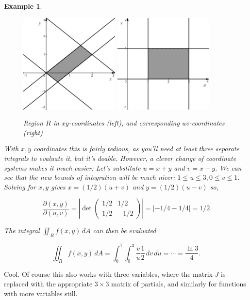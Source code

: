 \documentclass[12pt]{article}
\numberwithin{equation}{subsection}
\numberwithin{figure}{subsection}
\theoremstyle{note}
\newtheorem{example}[subsection]{Example}
\begin{document}
{\begin{example}
\begin{figure}[h!]
\centering 
\includegraphics[height=50mm]{Images/ws65-xy} \hspace{30mm} \includegraphics[height=50mm]{Images/ws65-uv}
\caption{Region $R$ in $xy$-coordinates (left), and corresponding $uv$-coordinates (right)}
\label{fig-change-of-var}
\end{figure}


With $x,y$ coordinates this is fairly tedious, as you'll need at least three separate integrals to evaluate it, but it's doable. However, a clever change of coordinate systems makes it much easier: Let's substitute $u=x+y$ and $v=x-y$. We can see that the new bounds of integration will be much nicer: $1\leq u\leq 3, 0\leq v \leq 1$. Solving for $x,y$ gives $x=(1/2)(u+v)$ and $y=(1/2)(u-v)$ so, 

\[ \dfrac{\partial(x,y)}{\partial(u,v)} = \left| \det \begin{pmatrix} 1/2 & 1/2 \\ 1/2 & -1/2 \end{pmatrix} \right|=|-1/4-1/4|=1/2\]

The integral $\iint_R f(x,y)\,dA$ can then  be evaluated

\[ \iint_R f(x,y)\,dA = \int_0^1 \int_0^3 \dfrac{v}{u} \dfrac{1}{2} \,dv\,du= \cdots = \dfrac{\ln 3}{4}.\] 
\end{example}

Cool. Of course this also works with three variables, where the matrix $J$ is replaced with the appropriate $3\times 3$ matrix of partials, and similarly for functions with more variables still. 

}
\end{document}
